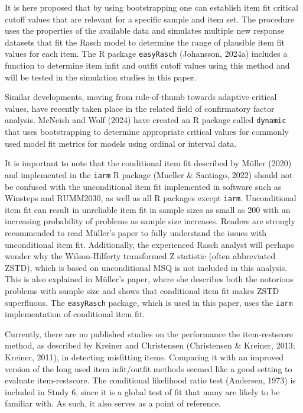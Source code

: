\documentclass[
  letterpaper,
  DIV=11,
  numbers=noendperiod]{scrartcl}
\begin{document}
It is here proposed that by using bootstrapping one can establish item
fit critical cutoff values that are relevant for a specific sample and
item set. The procedure uses the properties of the available data and
simulates multiple new response datasets that fit the Rasch model to
determine the range of plausible item fit values for each item. The R
package \texttt{easyRasch} (Johansson, 2024a) includes a function to
determine item infit and outfit cutoff values using this method and will
be tested in the simulation studies in this paper.

Similar developments, moving from rule-of-thumb towards adaptive
critical values, have recently taken place in the related field of
confirmatory factor analysis. McNeish and Wolf (2024) have created an R
package called \texttt{dynamic} that uses bootstrapping to determine
appropriate critical values for commonly used model fit metrics for
models using ordinal or interval data.

It is important to note that the conditional item fit described by
Müller (2020) and implemented in the \texttt{iarm} R package (Mueller \&
Santiago, 2022) should not be confused with the unconditional item fit
implemented in software such as Winsteps and RUMM2030, as well as all R
packages except \texttt{iarm}. Unconditional item fit can result in
unreliable item fit in sample sizes as small as 200 with an increasing
probability of problems as sample size increases. Readers are strongly
recommended to read Müller's paper to fully understand the issues with
unconditional item fit. Additionally, the experienced Rasch analyst will
perhaps wonder why the Wilson-Hilferty transformed Z statistic (often
abbreviated ZSTD), which is based on unconditional MSQ is not included
in this analysis. This is also explained in Müller's paper, where she
describes both the notorious problems with sample size and shows that
conditional item fit makes ZSTD superfluous. The \texttt{easyRasch}
package, which is used in this paper, uses the \texttt{iarm}
implementation of conditional item fit.

Currently, there are no published studies on the performance the
item-restscore method, as described by Kreiner and Christensen
(Christensen \& Kreiner, 2013; Kreiner, 2011), in detecting misfitting
items. Comparing it with an improved version of the long used item
infit/outfit methods seemed like a good setting to evaluate
item-restscore. The conditional likelihood ratio test (Andersen, 1973)
is included in Study 6, since it is a global test of fit that many are
likely to be familiar with. As such, it also serves as a point of
reference.
\end{document}
